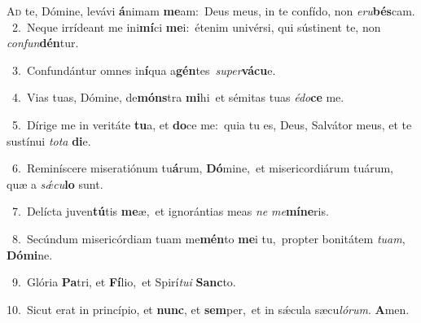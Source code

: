 \lettrine{\initial\textcolor{\initialcolor}{A}}{d} te, Dómine, levávi \textbf{á}\-nimam \textbf{me}\-am:~\star Deus meus, in te confído, non \textit{e}\-\textit{ru}\textbf{bés}cam.\\
{\numbfont\textcolor{\numbcolor}{~2.}}~Neque irrídeant me ini\-\textbf{mí}\-ci \textbf{me}\-i:~\star étenim univérsi, qui sústinent te, non \textit{con}\-\textit{fun}\textbf{dén}tur.\par
{\numbfont\textcolor{\numbcolor}{~3.}}~Confundántur omnes in\-\textbf{í}\-qua a\-\textbf{gén}\-tes~\star \textit{su}\-\textit{per}\textbf{vá}\textbf{cu}e.\par
{\numbfont\textcolor{\numbcolor}{~4.}}~Vias tuas, Dómine, de\-\textbf{móns}\-tra \textbf{mi}\-hi~\star et sémitas tuas \textit{é}\-\textit{do}\textbf{ce} me.\par
{\numbfont\textcolor{\numbcolor}{~5.}}~Dírige me in veritáte \textbf{tu}\-a, et \textbf{do}\-ce me:~\star quia tu es, Deus, Salvátor meus, et te sustínui \textit{to}\-\textit{ta} \textbf{di}\-e.\par
{\numbfont\textcolor{\numbcolor}{~6.}}~Reminíscere miseratiónum tu\-\textbf{á}\-rum, \textbf{Dó}\-mine,~\star et misericordiárum tuárum, quæ a \textit{sǽ}\-\textit{cu}\textbf{lo} sunt.\par
{\numbfont\textcolor{\numbcolor}{~7.}}~Delícta juven\-\textbf{tú}\-tis \textbf{me}\-æ,~\star et ignorántias meas \textit{ne} \textit{me}\-\textbf{mí}\textbf{ne}ris.\par
{\numbfont\textcolor{\numbcolor}{~8.}}~Secúndum misericórdiam tuam me\-\textbf{mén}\-to \textbf{me}\-i tu,~\star propter bonitátem \textit{tu}\-\textit{am}, \textbf{Dó}\-\textbf{mi}ne.\par
{\numbfont\textcolor{\numbcolor}{~9.}}~Glória \textbf{Pa}\-tri, et \textbf{Fí}\-lio,~\star et Spirí\-\textit{tu}\-\textit{i} \textbf{Sanc}\-to.\par
{\numbfont\textcolor{\numbcolor}{10.}}~Sicut erat in princípio, et \textbf{nunc}\-, et \textbf{sem}\-per,~\star et in sǽcula sæcu\-\textit{ló}\-\textit{rum}. \textbf{A}\-men.\par
